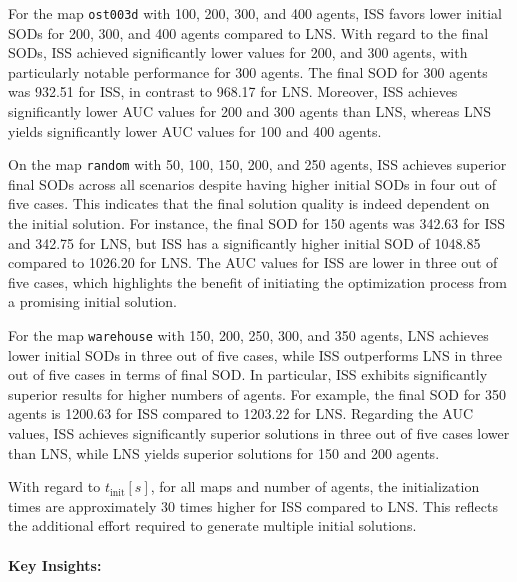 \documentclass[runningheads]{llncs}
\begin{document}
For the map \texttt{ost003d} with 100, 200, 300, and 400 agents, ISS favors lower initial SODs for 200, 300, and 400 agents compared to LNS. With regard to the final SODs, ISS achieved significantly lower values for 200, and 300 agents, with particularly notable performance for 300 agents. The final SOD for 300 agents was 932.51 for ISS, in contrast to 968.17 for LNS. Moreover, ISS achieves significantly lower AUC values for 200 and 300 agents than LNS, whereas LNS yields significantly lower AUC values for 100 and 400 agents.

On the map \texttt{random} with 50, 100, 150, 200, and 250 agents, ISS achieves superior final SODs across all scenarios despite having higher initial SODs in four out of five cases. This indicates that the final solution quality is indeed dependent on the initial solution. For instance, the final SOD for 150 agents was 342.63 for ISS and 342.75 for LNS, but ISS has a significantly higher initial SOD of 1048.85 compared to 1026.20 for LNS. The AUC values for ISS are lower in three out of five cases, which highlights the benefit of initiating the optimization process from a promising initial solution.

For the map \texttt{warehouse} with 150, 200, 250, 300, and 350 agents, LNS achieves lower initial SODs in three out of five cases, while ISS outperforms LNS in three out of five cases in terms of final SOD. In particular, ISS exhibits significantly superior results for higher numbers of agents. For example, the final SOD for 350 agents is 1200.63 for ISS compared to 1203.22 for LNS. Regarding the AUC values, ISS achieves significantly superior solutions in three out of five cases lower than LNS, while LNS yields superior solutions for 150 and 200 agents.

With regard to $t_\mathrm{init}[s]$, for all maps and number of agents, the initialization times are approximately 30 times higher for ISS compared to LNS. This reflects the additional effort required to generate multiple initial solutions.

\paragraph{Key Insights:}
\end{document}
